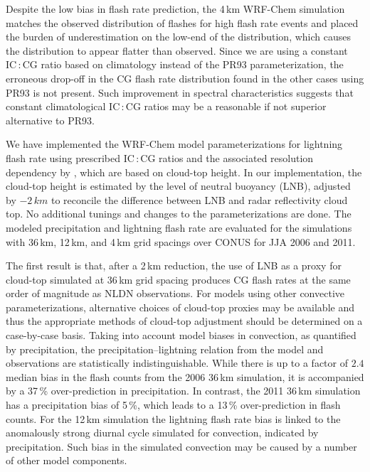 Despite the low bias in flash rate prediction, the 4\,\unit{km} WRF-Chem
simulation matches the observed distribution of flashes for high flash rate
events and placed the burden of underestimation on the low-end of the
distribution, which causes the distribution to appear flatter than observed.
Since we are using a constant IC\,:\,CG ratio based on
\citet{Boccippio:2001ys} climatology instead of the PR93 parameterization,
the erroneous drop-off in the CG flash rate distribution found in the other
cases using PR93 is not present. Such improvement in spectral characteristics
suggests that constant climatological IC\,:\,CG ratios may be a reasonable if
not superior alternative to PR93.

\conclusions\label{sec:conclusions}

We have implemented the WRF-Chem model parameterizations for lightning
flash rate using prescribed IC\,:\,CG ratios and the associated resolution dependency by
\citet{Price:1992wb,Price:1993fk,Price:1994fk}, which are based on cloud-top
height. In our implementation, the cloud-top height is estimated by the level
of neutral buoyancy (LNB), adjusted by $-2\,\unit{km}$ to reconcile the
difference between LNB and radar reflectivity cloud top. No additional
tunings and changes to the parameterizations are done. The modeled
precipitation and \mbox{lightning} flash rate are evaluated for the simulations with
36\,\unit{km}, 12\,\unit{km}, and 4\,\unit{km} grid spacings over CONUS for
JJA 2006 and 2011.

The first result is that, after a 2\,\unit{km} reduction, the use of LNB as a
proxy for cloud-top simulated at 36\,\unit{km} grid spacing produces CG flash
rates at the same order of magnitude as NLDN observations. For models using
other convective parameterizations, alternative choices of cloud-top proxies
may be available and thus the appropriate methods of cloud-top adjustment
should be determined on a case-by-case basis. Taking into account model
biases in convection, as quantified by precipitation, the
precipitation--lightning relation from the model and observations are
statistically indistinguishable. While there is up to a factor of $2.4$
median bias in the flash counts from the 2006 36\,\unit{km} simulation, it is
accompanied by a 37\,{\%} over-prediction in precipitation. In contrast, the
2011 36\,\unit{km} simulation has a precipitation bias of 5\,{\%}, which
leads to a 13\,{\%} over-prediction in flash counts. For the 12\,\unit{km}
simulation the lightning flash rate bias is linked to the anomalously strong
diurnal cycle simulated for convection, indicated by precipitation. Such bias
in the simulated convection may be caused by a number of other model
components.

